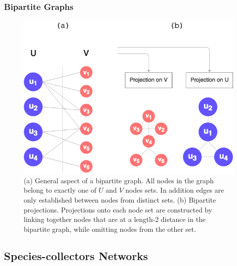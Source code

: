 \documentclass[a4paper]{article}
\begin{document}





\subsubsection{Bipartite Graphs}

  \begin{figure}[h!]
  	\centering
    \includegraphics[width=0.5\linewidth]{figures/bipartite_general.png}
    \caption{(a) General aspect of a bipartite graph. All nodes in the graph belong to exactly one of $U$ and $V$ nodes sets. In addition edges are only established between nodes from distinct sets. (b) Bipartite projections. Projections onto each node set are constructed by linking together nodes that are at a length-2 distance in the bipartite graph, while omitting nodes from the other set.}
    \label{fig:bipartite_general}
  \end{figure}


\subsection{Species-collectors Networks}
\end{document}
